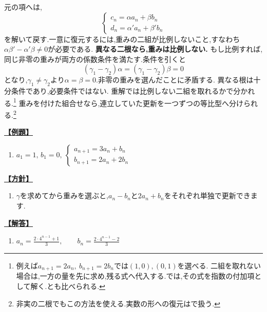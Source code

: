 元の項へは,
\[
  \begin{cases}
    c_n=\alpha a_n+\beta b_n\\
    d_n=\alpha'a_n+\beta'b_n
  \end{cases}
\]
を解いて戻す.一意に復元するには,重みの二組が比例しないこと,すなわち$\alpha\beta'-\alpha'\beta\ne0$が必要である.
\textbf{異なる二根なら,重みは比例しない.}
もし比例すれば,同じ非零の重みが両方の係数条件を満たす.条件を引くと
\[
  (\gamma_1-\gamma_2)\alpha=(\gamma_1-\gamma_2)\beta=0
\]
となり,$\gamma_1\ne\gamma_2$より$\alpha=\beta=0$.非零の重みを選んだことに矛盾する.
異なる根は十分条件であり,必要条件ではない.
重解では比例しない二組を取れるかで分かれる.\footnote{例えば$a_{n+1}=2a_n,\ b_{n+1}=2b_n$では$(1,0),(0,1)$を選べる.
  二組を取れない場合は,一方の量を先に求め,残る式へ代入する.では,その式を指数の付加項として解く.とも比べられる.}
重みを付けた組合せなら,連立していた更新を一つずつの等比型へ分けられる.\footnote{非実の二根でもこの方法を使える.実数の形への復元はで扱う.}

\noindent \hyperlink{book:example-system-1:answer:2}{\textbf{【例題】}}\par\nobreak
\begin{enumerate}[start=2,label=(\arabic*),parsep=3pt,format=\bookitemlink{example-system-1}{problem}{answer}]
  \item $\displaystyle a_1=1,\,b_1=0,\ \begin{cases}a_{n+1}=3a_n+b_n\\ b_{n+1}=2a_n+2b_n\end{cases}$
\end{enumerate}

\noindent \hyperlink{book:example-system-1:problem:2}{\textbf{【方針】}}\par\nobreak
\begin{enumerate}[start=2,label=(\arabic*),parsep=3pt,format=\bookitemlink{example-system-1}{hint}{problem}]
  \item $\gamma$を求めてから重みを選ぶと,$a_n-b_n$と$2a_n+b_n$をそれぞれ単独で更新できます.
\end{enumerate}

\noindent \hyperlink{book:example-system-1:problem:2}{\textbf{【解答】}}\par\nobreak
\begin{enumerate}[start=2,label=(\arabic*),parsep=3pt,format=\bookitemlink{example-system-1}{answer}{problem}]
  \item $\displaystyle a_n=\frac{2\cdot4^{n-1}+1}{3},\qquad b_n=\frac{2\cdot4^{n-1}-2}{3}$
\end{enumerate}

